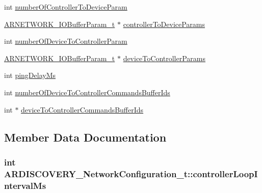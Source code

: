 \begin{DoxyCompactItemize}
int \hyperlink{struct_a_r_d_i_s_c_o_v_e_r_y___network_configuration__t_a8165c073202b18ca6a634b3e6a81b935}{number\+Of\+Controller\+To\+Device\+Param}
\item 
\hyperlink{struct_a_r_n_e_t_w_o_r_k___i_o_buffer_param__t}{A\+R\+N\+E\+T\+W\+O\+R\+K\+\_\+\+I\+O\+Buffer\+Param\+\_\+t} $\ast$ \hyperlink{struct_a_r_d_i_s_c_o_v_e_r_y___network_configuration__t_a6659f0b09198b917493ceb33dcc396e4}{controller\+To\+Device\+Params}
\item 
int \hyperlink{struct_a_r_d_i_s_c_o_v_e_r_y___network_configuration__t_a4bbfe88e4c245e0a44cb1f06733042c1}{number\+Of\+Device\+To\+Controller\+Param}
\item 
\hyperlink{struct_a_r_n_e_t_w_o_r_k___i_o_buffer_param__t}{A\+R\+N\+E\+T\+W\+O\+R\+K\+\_\+\+I\+O\+Buffer\+Param\+\_\+t} $\ast$ \hyperlink{struct_a_r_d_i_s_c_o_v_e_r_y___network_configuration__t_aeaa03e68aee5cc80d5ca19402c8b5d96}{device\+To\+Controller\+Params}
\item 
int \hyperlink{struct_a_r_d_i_s_c_o_v_e_r_y___network_configuration__t_adc6b8e75aaa14ddf7fd47a0953eb116a}{ping\+Delay\+Ms}
\item 
int \hyperlink{struct_a_r_d_i_s_c_o_v_e_r_y___network_configuration__t_a44c23601ba0c042620618b2039cabf1c}{number\+Of\+Device\+To\+Controller\+Commands\+Buffer\+Ids}
\item 
int $\ast$ \hyperlink{struct_a_r_d_i_s_c_o_v_e_r_y___network_configuration__t_ae7d7c45305655e959c4b1dfe9e239911}{device\+To\+Controller\+Commands\+Buffer\+Ids}
\end{DoxyCompactItemize}


\subsection{Member Data Documentation}
\subsubsection[{\texorpdfstring{controller\+Loop\+Interval\+Ms}{controllerLoopIntervalMs}}]{\setlength{\rightskip}{0pt plus 5cm}int A\+R\+D\+I\+S\+C\+O\+V\+E\+R\+Y\+\_\+\+Network\+Configuration\+\_\+t\+::controller\+Loop\+Interval\+Ms}\hypertarget{struct_a_r_d_i_s_c_o_v_e_r_y___network_configuration__t_a87b25e0a2d9f0fb6e70c75e494e25aa0}{}\label{struct_a_r_d_i_s_c_o_v_e_r_y___network_configuration__t_a87b25e0a2d9f0fb6e70c75e494e25aa0}

